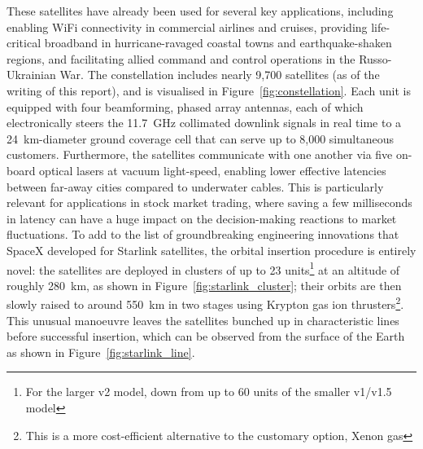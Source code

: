 \documentclass{article}
\begin{document}
These satellites have already been used for several key applications, including enabling WiFi connectivity in commercial airlines and cruises, providing life-critical broadband in hurricane-ravaged coastal towns and earthquake-shaken regions, and facilitating allied command and control operations in the Russo-Ukrainian War. The constellation includes nearly 9,700 satellites (as of the writing of this report), and is visualised in Figure~\ref{fig:constellation}. Each unit is equipped with four beamforming, phased array antennas, each of which electronically steers the \SI{11.7}{\giga\hertz} collimated downlink signals in real time to a \SI{24}{\kilo\metre}-diameter ground coverage cell that can serve up to 8,000 simultaneous customers. Furthermore, the satellites communicate with one another via five on-board optical lasers at vacuum light-speed, enabling lower effective latencies between far-away cities compared to underwater cables. This is particularly relevant for applications in stock market trading, where saving a few milliseconds in latency can have a huge impact on the decision-making reactions to market fluctuations. To add to the list of groundbreaking engineering innovations that SpaceX developed for Starlink satellites, the orbital insertion procedure is entirely novel: the satellites are deployed in clusters of up to 23 units\footnote{For the larger v2 model, down from up to 60 units of the smaller v1/v1.5 model} at an altitude of roughly \SI{280}{\kilo\metre}, as shown in Figure~\ref{fig:starlink_cluster}; their orbits are then slowly raised to around \SI{550}{\kilo\metre} in two stages using Krypton gas ion thrusters\footnote{This is a more cost-efficient alternative to the customary option, Xenon gas}. This unusual manoeuvre leaves the satellites bunched up in characteristic lines before successful insertion, which can be observed from the surface of the Earth as shown in Figure~\ref{fig:starlink_line}.
\end{document}

